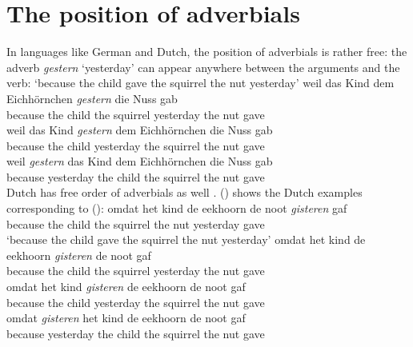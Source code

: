 \section{The position of adverbials}
\label{sec-phenomena-position-of-adverbials}

In languages like German and Dutch, the position of adverbials is rather free: the adverb \emph{gestern}
`yesterday' can appear anywhere between the arguments and the verb:
\eal
\ex
{}
\glt `because the child gave the squirrel the nut yesterday'
\ex 
\gll weil das Kind dem Eichhörnchen \emph{gestern} die Nuss gab\\
     because the child the squirrel yesterday the nut gave\\
\ex 
\gll weil das Kind \emph{gestern} dem Eichhörnchen die Nuss gab\\
     because the child yesterday the squirrel the nut gave\\
\ex 
\gll weil \emph{gestern} das Kind dem Eichhörnchen die Nuss gab\\
     because yesterday the child the squirrel the nut gave\\
\zl
Dutch has free order of adverbials as well \parencites[]{Koster99a-u}[Section~6]{Bouma2003a-u}. () shows the Dutch examples corresponding to ():
\eal
\ex
\gll omdat het kind de eekhoorn de noot \emph{gisteren} gaf\\ 
     because the child the squirrel the nut yesterday gave\\\dutch
\glt `because the child gave the squirrel the nut yesterday'
\ex 
\gll omdat het kind de eekhoorn \emph{gisteren} de noot gaf\\
     because the child the squirrel yesterday the nut gave\\
\ex 
\gll omdat het kind \emph{gisteren} de eekhoorn de noot gaf\\
     because the child yesterday the squirrel the nut gave\\
\ex 
\gll omdat \emph{gisteren} het kind de eekhoorn de noot gaf\\
     because yesterday the child the squirrel the nut gave\\
\zl




